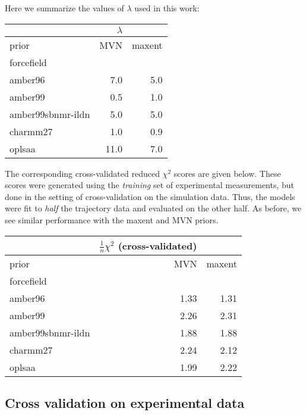 \documentclass[journal=jacsat,manuscript=article]{achemso}
\begin{document}
Here we summarize the values of $\lambda$ used in this work:

\vspace{5mm}

\begin{tabular}{lrr}
\toprule
{}                &$\lambda$  &         \\
\midrule
prior &       MVN &  maxent \\
forcefield        &           &         \\
amber96           &      7.0  &    5.0  \\
amber99           &      0.5  &    1.0 \\
amber99sbnmr-ildn &      5.0  &    5.0 \\
charmm27          &      1.0  &    0.9 \\
oplsaa            &     11.0 &    7.0 \\
\bottomrule
\end{tabular}

\vspace{5mm}

The corresponding cross-validated reduced $\chi^2$ scores are given below.  These scores were generated using the \emph{training} set of experimental measurements, but done in the setting of cross-validation on the simulation data.  Thus, the models were fit to \emph{half} the trajectory data and evaluated on the other half.  As before, we see similar performance with the maxent and MVN priors.  

\vspace{5mm}


\begin{tabular}{lrr}
\toprule
{} &  $\frac{1}{n}\chi^2$ (cross-validated) &         \\
\midrule
prior &       MVN &  maxent \\
forcefield        &           &         \\
amber96           &      1.33 &    1.31 \\
amber99           &      2.26 &    2.31 \\
amber99sbnmr-ildn &      1.88 &    1.88 \\
charmm27          &      2.24 &    2.12 \\
oplsaa            &      1.99 &    2.22 \\
\bottomrule
\end{tabular}


\subsection{Cross validation on experimental data}
\end{document}
